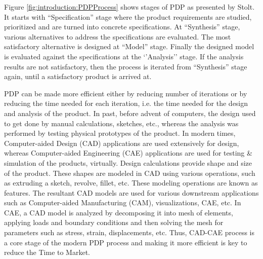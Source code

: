 	\bigskip
	
Figure \ref{fig:introduction:PDPProcess} shows stages of PDP as presented by Stolt\cite{Stolt2008}. It starts with ``Specification'' stage where the product requirements are studied, prioritized and are turned into concrete specifications. At ``Synthesis'' stage, various alternatives to address the specifications are evaluated. The most satisfactory alternative is designed at ``Model'' stage. Finally the designed model is evaluated against the specifications at the `'Analysis'' stage. If the analysis results are not satisfactory, then the process is iterated from ``Synthesis'' stage again, until a satisfactory product is arrived at.

PDP can be made more efficient either by reducing number of iterations or by reducing the time needed for each iteration, i.e. the time needed for the design and analysis of the product.
In past, before advent of computers, the design used to get done by manual calculations, sketches, etc., whereas the analysis was performed by testing physical prototypes of the product. In modern times, Computer-aided Design (CAD) applications are used extensively for design, whereas Computer-aided Engineering (CAE) applications are used for testing \& simulation of the products, virtually. Design calculations provide shape and size of the product. These shapes are modeled in CAD using various operations, such as extruding a sketch, revolve, fillet, etc. These modeling operations are known as features. The resultant CAD models are used for various downstream applications such as Computer-aided Manufacturing (CAM), visualizations, CAE, etc. In CAE, a CAD model is analyzed by decomposing it into mesh of elements, applying loads and boundary conditions and then solving the mesh for parameters such as stress, strain, displacements, etc. Thus, CAD-CAE process is a core stage of the modern PDP process and making it more efficient is key to reduce the Time to Market.

%
%

